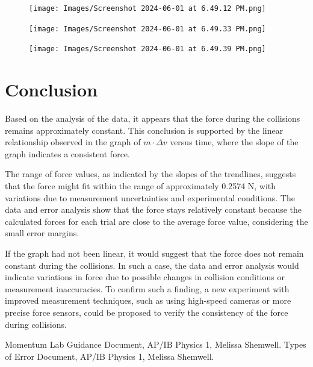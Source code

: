 \documentclass[12pt]{article}
\begin{document}
\begin{figure}[H]
    \centering
    \texttt{[image: Images/Screenshot 2024-06-01 at 6.49.12 PM.png]}
    \label{fig:image4}
\end{figure}

\begin{figure}[H]
    \centering
    \texttt{[image: Images/Screenshot 2024-06-01 at 6.49.33 PM.png]}
    \label{fig:image5}
\end{figure}

\begin{figure}[H]
    \centering
    \texttt{[image: Images/Screenshot 2024-06-01 at 6.49.39 PM.png]}
    \label{fig:image6}
\end{figure}

\section{Conclusion}
Based on the analysis of the data, it appears that the force during the collisions remains approximately constant. This conclusion is supported by the linear relationship observed in the graph of $m \cdot \Delta v$ versus time, where the slope of the graph indicates a consistent force.

The range of force values, as indicated by the slopes of the trendlines, suggests that the force might fit within the range of approximately 0.2574 N, with variations due to measurement uncertainties and experimental conditions. The data and error analysis show that the force stays relatively constant because the calculated forces for each trial are close to the average force value, considering the small error margins.

If the graph had not been linear, it would suggest that the force does not remain constant during the collisions. In such a case, the data and error analysis would indicate variations in force due to possible changes in collision conditions or measurement inaccuracies. To confirm such a finding, a new experiment with improved measurement techniques, such as using high-speed cameras or more precise force sensors, could be proposed to verify the consistency of the force during collisions.

\begin{thebibliography}{9}
Momentum Lab Guidance Document, AP/IB Physics 1, Melissa Shemwell.
Types of Error Document, AP/IB Physics 1, Melissa Shemwell.
\end{thebibliography}
\end{document}
